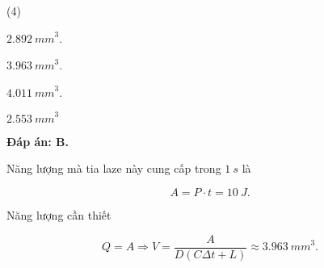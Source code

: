 \begin{enumerate}[label=\bfseries Câu \arabic*:]
{		
	}
	
	\loigiai
	{		\textbf{Đáp án: B.}
		
		Năng lượng mà tia laze này cung cấp trong $\SI{1}{s}$ là 
		
		$$A = P \cdot t = \SI{10}{J}.$$
		
		Năng lượng cần thiết 
		
		$$Q = A \Rightarrow V = \dfrac{A}{D(C\Delta t + L)} \approx \SI{3,963}{mm}^3.$$
		
	}
\end{enumerate}